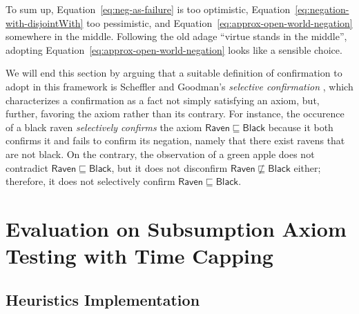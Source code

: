 \documentclass{llncs}
\begin{document}
To sum up, Equation~\ref{eq:neg-as-failure} is too optimistic,
Equation~\ref{eq:negation-with-disjointWith} too pessimistic, and
Equation~\ref{eq:approx-open-world-negation} somewhere in the middle.
Following the old adage ``virtue stands in the middle'', adopting
Equation~\ref{eq:approx-open-world-negation} looks like a sensible choice.

We will end this section by arguing that a suitable definition of confirmation to adopt in this
framework is Scheffler and Goodman's \emph{selective confirmation} \cite{SchefflerGoodman1972},
which characterizes a confirmation as a fact not simply satisfying an axiom, but, further,
favoring the axiom rather than its contrary.
For instance, the occurence of a black raven \emph{selectively confirms} the axiom
$\mathsf{Raven} \sqsubseteq \mathsf{Black}$ because it both confirms it and fails to confirm its
negation, namely that there exist ravens that are not black. On the contrary, the observation of
a green apple does not contradict $\mathsf{Raven} \sqsubseteq \mathsf{Black}$,
but it does not disconfirm $\mathsf{Raven} \not\sqsubseteq \mathsf{Black}$
either; therefore, it does not selectively confirm $\mathsf{Raven} \sqsubseteq \mathsf{Black}$.

\section{Evaluation on Subsumption Axiom Testing with Time Capping}
\label{evaluation}

\subsection{Heuristics Implementation}
\end{document}
